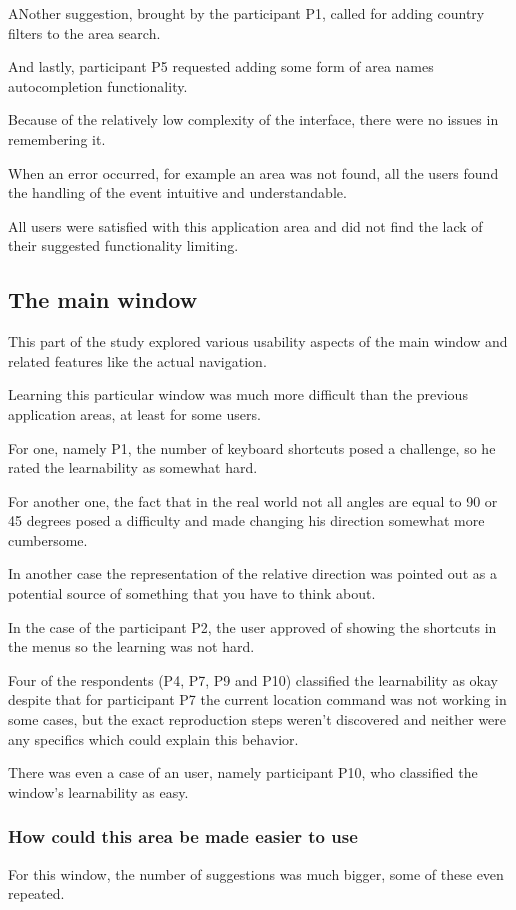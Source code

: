 \documentclass[nolof,digital]{fithesis3}
\begin{document}
ANother suggestion, brought by the participant P1, called for adding country filters to the area search. 

And lastly, participant P5 requested adding some form of area names autocompletion functionality.

Because of the relatively low complexity of the interface, there were no issues in remembering it.

When an error occurred, for example an area was not found, all the users found the handling of the event intuitive and understandable.

All users were satisfied with this application area and did not find the lack of their suggested functionality limiting.
\subsection{The main window}
This part of the study explored various usability aspects of the main window and related features like the actual navigation.

Learning this particular window was much more difficult than the previous application areas, at least for some users.

For one, namely P1, the number of keyboard shortcuts posed a challenge, so he rated the learnability as somewhat hard.

For another one, the fact that in the real world not all angles are equal to 90 or 45 degrees posed a difficulty and made changing his direction somewhat more cumbersome.

In another case the representation of the relative direction was pointed out as a potential source of something that you have to think about.

In the case of the participant P2, the user approved of showing the shortcuts in the menus so the learning was not hard.

Four of the respondents (P4, P7, P9 and P10) classified the learnability as okay despite that for participant P7 the current location command was not working in some cases, but the exact reproduction steps weren't discovered and neither were any specifics which could explain this behavior.

There was even a case of an user, namely participant P10, who classified the window's learnability as easy.
\subsubsection{How could this area be made easier to use}
For this window, the number of suggestions was much bigger, some of these even repeated.
\end{document}
